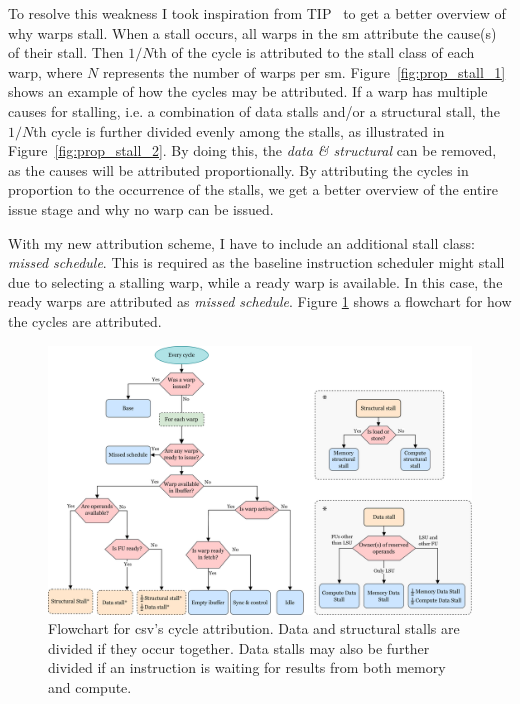 To resolve this weakness I took inspiration from TIP~\cite{TIP} to get a better overview of why warps stall. When a stall occurs, all warps in the \acrshort{sm} attribute the cause(s) of their stall. Then $1/N$th of the cycle is attributed to the stall class of each warp, where $N$ represents the number of warps per \acrshort{sm}. Figure~\ref{fig:prop_stall_1} shows an example of how the cycles may be attributed. If a warp has multiple causes for stalling, i.e. a combination of data stalls and/or a structural stall, the $1/N$th cycle is further divided evenly among the stalls, as illustrated in Figure~\ref{fig:prop_stall_2}. By doing this, the \textit{data \& structural} can be removed, as the causes will be attributed proportionally. By attributing the cycles in proportion to the occurrence of the stalls, we get a better overview of the entire issue stage and why no warp can be issued. 

With my new attribution scheme, I have to include an additional stall class: \textit{missed schedule}. This is required as the baseline instruction scheduler might stall due to selecting a stalling warp, while a ready warp is available. In this case, the ready warps are attributed as \textit{missed schedule}. Figure \ref{fig:cpi_flowchart} shows a flowchart for how the cycles are attributed.

\begin{figure}
    \centering
    \includegraphics[width=\textwidth]{figures/flowchart_grouped_v2.png}
    \caption[Flowchart for \acrshort{csv}'s cycle attribution.]{Flowchart for \acrshort{csv}'s cycle attribution. Data and structural stalls are divided if they occur together. Data stalls may also be further divided if an instruction is waiting for results from both memory and compute.}
    \label{fig:cpi_flowchart}
\end{figure}